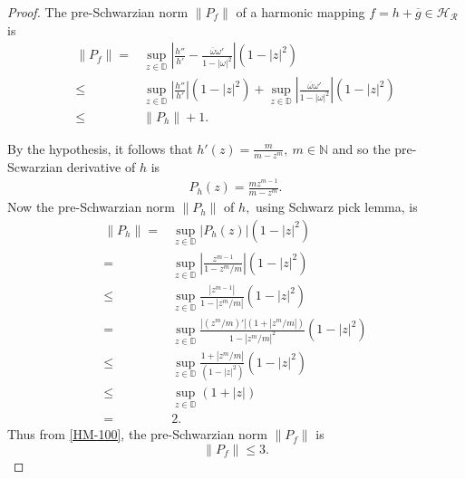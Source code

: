 \documentclass[10pt,a4paper]{amsart}
\begin{document}
	\begin{proof}
		The pre-Schwarzian norm $\|P_f\|$ of a harmonic mapping $f=h+\overline{g}\in\mathcal{H_R}$ is 
		\begin{align}\label{HM-100}
			\|P_f\|= & \sup_{z \in \mathbb{D}}\left|\frac{h''}{h'}-\frac{\overline{\omega}\omega'}{1-|\omega|^2}\right|(1-|z|^2)\\\nonumber
			\le & \sup_{z \in \mathbb{D}}\left|\frac{h''}{h'}\right|(1-|z|^2)+\sup_{z \in \mathbb{D}}\left|\frac{\overline{\omega}\omega'}{1-|\omega|^2}\right|(1-|z|^2)\\\nonumber
			\le & 	\|P_h\|+1.
		\end{align}
		
		
		
		
		By the hypothesis, it follows that 
		$h'(z)=\frac{m}{m-z^m},~m\in\mathbb{N}$
		and so the pre-Scwarzian derivative of $h$ is
		\begin{align*}
			P_h(z)=\frac{mz^{m-1}}{m-z^m}. 
		\end{align*}
		Now the pre-Schwarzian norm $\|P_h\|$ of $h,$ using Schwarz pick lemma, is 
		\begin{align*}
			\|P_h\|=&\sup\limits_{z\in\mathbb{D}}|P_h(z)|(1-|z|^2)\\
			=&\sup\limits_{z\in\mathbb{D}}\left|\frac{z^{m-1}}{1-z^m/m}\right|(1-|z|^2)\\
			\le &\sup\limits_{z\in\mathbb{D}}\frac{|z^{m-1}|}{1-\left|z^m/m\right|}(1-|z|^2)\\
			=&\sup\limits_{z\in\mathbb{D}}\frac{|\left(z^m/m\right)'|\left(1+\left|z^m/m\right|\right)}{1-\left|z^m/m\right|^2}(1-|z|^2)\\
			\le&\sup\limits_{z\in\mathbb{D}}\frac{1+\left|z^m/m\right|}{(1-|z|^2)}(1-|z|^2)\\
			\le& \sup\limits_{z\in\mathbb{D}}(1+|z|)\\
			=&2.
		\end{align*}
		Thus from \eqref{HM-100}, the pre-Schwarzian norm $\|P_f\|$ is
		$$\|P_f\|\le 3.$$
		

\end{proof}
\end{document}
